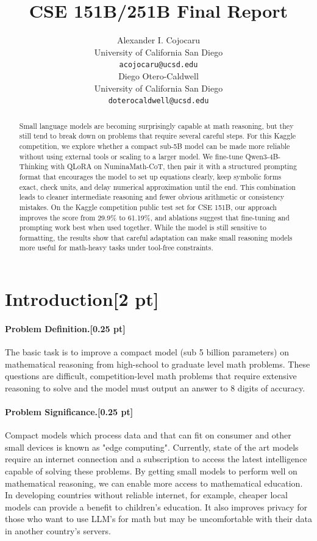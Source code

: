 \documentclass{article}
\title{
CSE 151B/251B Final Report
\\
}
\author{%
  Alexander I. Cojocaru
  \\
  University of California San Diego\\
  \texttt{acojocaru@ucsd.edu} \\
  \And
  Diego Otero-Caldwell\\
  University of California San Diego\\
  \texttt{doterocaldwell@ucsd.edu} \\
}
\begin{document}
\maketitle


\begin{abstract}
Small language models are becoming surprisingly capable at math reasoning, but they still tend to break down on problems that require several careful steps. For this Kaggle competition, we explore whether a compact sub-5B model can be made more reliable without using external tools or scaling to a larger model. We fine-tune Qwen3-4B-Thinking with QLoRA on NuminaMath-CoT, then pair it with a structured prompting format that encourages the model to set up equations clearly, keep symbolic forms exact, check units, and delay numerical approximation until the end. This combination leads to cleaner intermediate reasoning and fewer obvious arithmetic or consistency mistakes. On the Kaggle competition public test set for CSE 151B, our approach improves the score from 29.9\% to 61.19\%, and ablations suggest that fine-tuning and prompting work best when used together. While the model is still sensitive to formatting, the results show that careful adaptation can make small reasoning models more useful for math-heavy tasks under tool-free constraints.
\end{abstract}


\section{Introduction[2 pt]}
\label{sec:intro}

\paragraph{Problem Definition.[0.25 pt]}
The basic task is to improve a compact model (sub 5 billion parameters) on mathematical reasoning from high-school to graduate level math problems. These questions are difficult, competition-level math problems that require extensive reasoning to solve and the model must output an answer to 8 digits of accuracy.

\paragraph{Problem Significance.[0.25 pt]}
Compact models which process data and that can fit on consumer and other small devices is known as "edge computing". Currently, state of the art models require an internet connection and a subscription to access the latest intelligence capable of solving these problems. By getting small models to perform well on mathematical reasoning, we can enable more access to mathematical education. In developing countries without reliable internet, for example, cheaper local models can provide a benefit to children's education. It also improves privacy for those who want to use LLM's for math but may be uncomfortable with their data in another country's servers.
\end{document}
